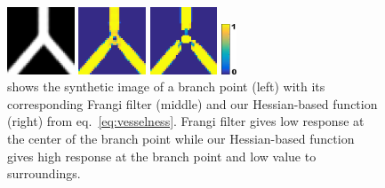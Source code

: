 \documentclass{article}
\begin{document}
\begin{figure}[b!]
	\vspace{-10pt}
	\centering
	\begin{minipage}[b]{0.24\linewidth}
		\centerline{\includegraphics[height=2cm]{img/branch.png}}
	\end{minipage}
	\begin{minipage}[b]{0.24\linewidth}
		\centerline{\includegraphics[height=2cm]{img/branch_frangi.png}}
	\end{minipage}
	\begin{minipage}[b]{0.24\linewidth}
		\centerline{\includegraphics[height=2cm]{img/branch_hessian.png}}
	\end{minipage}
	\hspace{-10pt}
	\begin{minipage}[b]{0.12\linewidth}
		\centerline{\includegraphics[height=1.5cm]{img/colorbar.png}}
		\vspace{7pt}
	\end{minipage}
	\vspace{-10pt}
	\caption{\small{shows the synthetic image of a branch point (left) with its corresponding Frangi filter (middle) and our Hessian-based function (right) from eq.~\ref{eq:vesselness}. Frangi filter gives low response at the center of the branch point while our Hessian-based function gives high response at the branch point and low value to surroundings. }}
	\label{fig:vesselness}
	\vspace{-10pt}
\end{figure}
\end{document}
